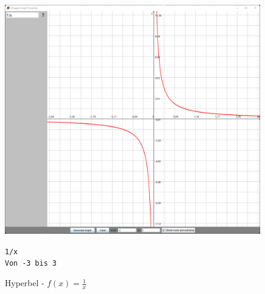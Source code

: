 \documentclass[12pt]{article}
\begin{document}
	\begin{figure}[!ht]
		\begin{center}
			\includegraphics[scale=0.5]{images/sample2.png}
		\end{center}
		\caption{Hyperbel - $f(x) = \frac{1}{x}$}

		\begin{center}
			\texttt{1/x} \\
			\texttt{Von -3 bis 3}
		\end{center}
	\end{figure}
\end{document}
